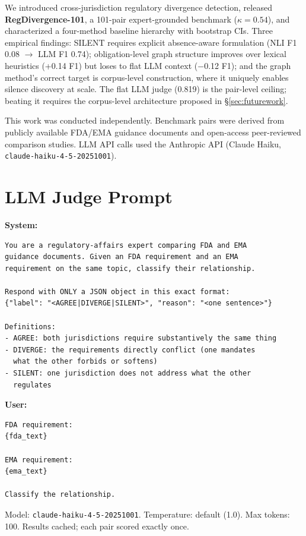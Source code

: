 \documentclass[sigconf]{acmart}
\begin{document}
We introduced cross-jurisdiction regulatory divergence detection, released
\textbf{RegDivergence-101}, a 101-pair expert-grounded benchmark
($\kappa = 0.54$), and characterized a
four-method baseline hierarchy with bootstrap CIs. Three empirical findings:
SILENT requires explicit absence-aware formulation (NLI F1 0.08 $\to$ LLM F1
0.74); obligation-level graph structure improves over lexical heuristics (+0.14
F1) but loses to flat LLM context ($-$0.12 F1); and the graph method's correct
target is corpus-level construction, where it uniquely enables silence
discovery at scale. The flat LLM judge (0.819) is the pair-level ceiling;
beating it requires the corpus-level architecture proposed in
\S\ref{sec:futurework}.

\begin{acks}
This work was conducted independently. Benchmark pairs were derived from
publicly available FDA/EMA guidance documents and open-access peer-reviewed
comparison studies. LLM API calls used the Anthropic API (Claude Haiku,
\texttt{claude-haiku-4-5-20251001}).
\end{acks}




\appendix

\section{LLM Judge Prompt}
\label{app:prompt}

\textbf{System:}
\begin{verbatim}
You are a regulatory-affairs expert comparing FDA and EMA
guidance documents. Given an FDA requirement and an EMA
requirement on the same topic, classify their relationship.

Respond with ONLY a JSON object in this exact format:
{"label": "<AGREE|DIVERGE|SILENT>", "reason": "<one sentence>"}

Definitions:
- AGREE: both jurisdictions require substantively the same thing
- DIVERGE: the requirements directly conflict (one mandates
  what the other forbids or softens)
- SILENT: one jurisdiction does not address what the other
  regulates
\end{verbatim}

\textbf{User:}
\begin{verbatim}
FDA requirement:
{fda_text}

EMA requirement:
{ema_text}

Classify the relationship.
\end{verbatim}

Model: \texttt{claude-haiku-4-5-20251001}. Temperature: default (1.0).
Max tokens: 100. Results cached; each pair scored exactly once.
\end{document}
